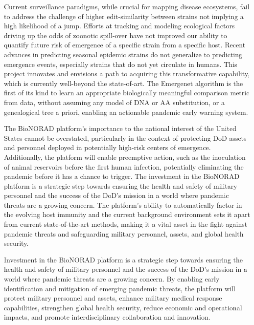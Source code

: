 \documentclass[onecolumn, compsoc,12pt]{IEEEtran}
\begin{document}
Current surveillance paradigms, while crucial for mapping disease ecosystems, fail to address the challenge of higher edit-similarity between strains not implying a high likelihood of a jump. Efforts at tracking and modeling ecological factors driving up the odds of zoonotic spill-over have not improved our ability to quantify future risk of emergence of a specific strain from a specific host. Recent advances in predicting seasonal epidemic strains do not generalize to predicting emergence events, especially strains that do not yet circulate in humans. This project innovates and envisions a path to acquiring this transformative capability, which is currently well-beyond the state-of-art. The Emergenet algorithm is the first of its kind to learn an appropriate biologically meaningful comparison metric from data, without assuming any model of DNA or AA substitution, or a genealogical tree a priori, enabling an actionable pandemic early warning system.

The BioNORAD platform's importance to the national interest of the United States cannot be overstated, particularly in the context of protecting DoD assets and personnel deployed in potentially high-risk centers of emergence. Additionally, the platform will enable preemptive action, such as the inoculation of animal reservoirs before the first human infection, potentially eliminating the pandemic before it has a chance to trigger. The investment in the BioNORAD platform is a strategic step towards ensuring the health and safety of military personnel and the success of the DoD's mission in a world where pandemic threats are a growing concern.  The platform's ability to automatically factor in the evolving host immunity and the current background environment sets it apart from current state-of-the-art methods, making it a vital asset in the fight against pandemic threats and safeguarding military personnel, assets, and global health security.


Investment in the BioNORAD platform is a strategic step towards ensuring the health and safety of military personnel and the success of the DoD's mission in a world where pandemic threats are a growing concern. By enabling early identification and mitigation of emerging pandemic threats, the platform will protect military personnel and assets, enhance military medical response capabilities, strengthen global health security, reduce economic and operational impacts, and promote interdisciplinary collaboration and innovation.
\end{document}
